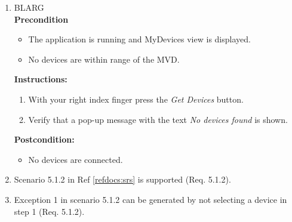 \documentclass[a4paper]{article}
\newlength{\testlabellength}
\newenvironment{testlist}{\begin{enumerate}[label=\bfseries Instruction \thesubsection.\arabic* , labelindent=0pt, labelwidth=\testlabellength , leftmargin=2cm]}{\end{enumerate}}
\newenvironment{precondition}{
{\color{white}BLARG}\\ 
\textbf{Precondition}
\begin{itemize}[labelindent=0cm, labelwidth=2cm , leftmargin=1cm]
}
{\end{itemize}}
\newenvironment{instruction}{
\textbf{Instructions:}
\begin{enumerate}[label=\bfseries  \arabic*., labelindent=0cm, labelwidth=2cm , leftmargin=1cm]
}
{\end{enumerate}}
\newenvironment{postcondition}{
\textbf{Postcondition:}
\begin{itemize}[labelindent=0cm, labelwidth=2cm , leftmargin=1cm]
}
{\end{itemize}}
\begin{document}
\begin{appendices}
\begin{testlist}
	\item 
		\begin{precondition}
			\item The application is running and MyDevices view is displayed.
			\item No devices are within range of the MVD.
		\end{precondition}
		\begin{instruction}
			\item With your right index finger press the \emph{Get Devices} button.
			\item Verify that a pop-up message with the text \emph{No devices found} is shown.
		\end{instruction}
		\begin{postcondition}
			\item No devices are connected.
		\end{postcondition}
	
	\item Scenario 5.1.2 in Ref \ref{refdocs:srs} is supported (Req. 5.1.2).

	\item Exception 1 in scenario 5.1.2 can be generated by not selecting a device in step 1 (Req. 5.1.2).


\end{testlist}
\end{appendices}
\end{document}
